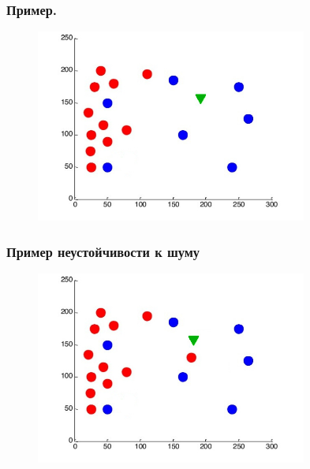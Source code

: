 \documentclass[12pt]{beamer}
\begin{document}
\begin{frame}\frametitle{Пример.}
\begin{figure}[htbp]
  \includegraphics[height=180pt, keepaspectratio = true]{1nearest}  
\end{figure}
\end{frame}

\begin{frame}\frametitle{Пример неустойчивости к шуму}
\begin{figure}[htbp]
  \includegraphics[height=180pt, keepaspectratio = true]{1nearest1}  
\end{figure}
\end{frame}



\end{document}
